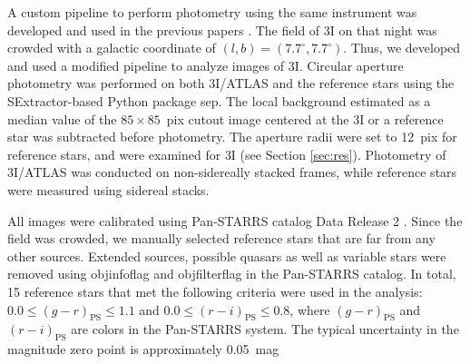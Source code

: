 \documentclass[]{pasj02}
\newcommand\I{3I/ATLAS\xspace}
\begin{document}
A custom pipeline to perform photometry using the same instrument was developed and used in the previous papers \citep{Beniyama2023a, Beniyama2023b, Beniyama2023c, Beniyama2024, Beniyama2025b}.
The field of 3I on that night was crowded with a galactic coordinate of $(l, b) = (7.7^{\circ}, 7.7^{\circ})$.
Thus, we developed and used a modified pipeline to analyze images of 3I.
Circular aperture photometry was performed on both \I and the reference stars using the SExtractor-based Python package sep. 
The local background estimated as a median value of the $85\times85$~pix cutout image centered at the 3I or a reference star was subtracted before photometry.
The aperture radii were set to 12~pix for reference stars, and were examined for 3I (see Section \ref{sec:res}).
Photometry of \I was conducted on non-sidereally stacked frames, while reference stars were measured using sidereal stacks.

All images were calibrated using Pan-STARRS catalog Data Release 2 \citep{Chambers2016}.
Since the field was crowded, we manually selected reference stars that are far from any other sources.
Extended sources, possible quasars as well as variable stars were removed using objinfoflag and objfilterflag in the Pan-STARRS catalog.
In total, 15 reference stars that met the following criteria were used in the analysis:
$0.0 \leq (g-r)_{\mathrm{PS}} \leq 1.1$ and $0.0 \leq (r-i)_{\mathrm{PS}} \leq 0.8$, where $(g-r)_{\mathrm{PS}}$ and $(r-i)_{\mathrm{PS}}$ are colors in the Pan-STARRS system.
The typical uncertainty in the magnitude zero point is approximately 0.05~mag
\end{document}
